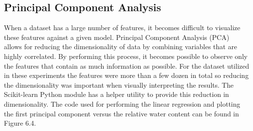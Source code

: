 \subsection{Principal Component Analysis}
When a dataset has a large number of features, it becomes difficult to visualize these features against a given model.  Principal Component Analysis (PCA) allows for reducing the dimensionality of data by combining variables that are highly correlated. By performing this process, it becomes possible to observe only the features that contain as much information as possible.  For the dataset utilized in these experiments the features were more than a few dozen in total so reducing the dimensionality was important when visually interpreting the results. The Scikit-learn Python module has a helper utility to provide this reduction in dimensionality.  The code used for performing the linear regression and plotting the first principal component versus the relative water content can be found in Figure 6.4.
\newpage
